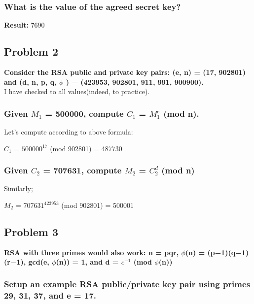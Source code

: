 \documentclass[11pt]{article}
\begin{document}
  
  
  
  
  
\newpage\subsubsection{\textbf{What is the value of the agreed secret key?}}

\textbf{Result: }7690

\subsection{Problem 2} \textbf{Consider the RSA public and private key pairs: (e, n) = (17, 902801) and (d, n, p, q, $\phi $ ) =
(423953, 902801, 911, 991, 900900).}\\
 
I have checked to all values(indeed, to practice). 

\subsubsection{\textbf{Given $M_{1}$ = 500000, compute $C_{1}$ = $M_{1}^{e}$ (mod n).}}

Let's compute according to above  formula:\\
\begin{center}
    $C_{1}$ = $500000^{17}$ (mod 902801) = 487730

\end{center}

\subsubsection{\textbf{Given $C_{2}$ = 707631, compute $M_{2}$ = $C_{2}^{d}$  (mod n)}}

Similarly; \\
\begin{center}
    $M_{2}$ = $707631^{423953}$ (mod 902801) = 500001
\end{center}

\subsection{Problem 3} \textbf{RSA with three primes would also work: n = pqr, $\phi $(n) = (p−1)(q−1)(r−1), gcd(e, $\phi $(n)) = 1,
and d = $e^{-1}$ (mod $\phi $(n))}

\subsubsection{\textbf{Setup an example RSA public/private key pair using primes 29, 31, 37, and e = 17.}}
\end{document}
